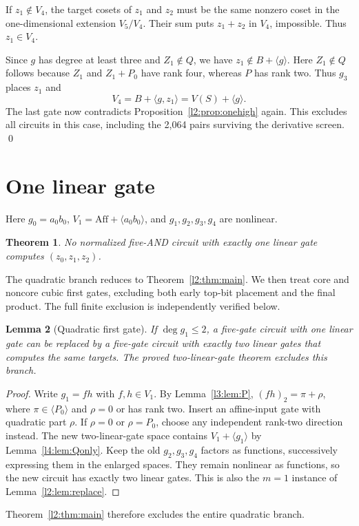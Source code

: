 \documentclass[11pt,a4paper]{article}
\theoremstyle{plain}
\newtheorem{theorem}{Theorem}
\newtheorem{lemma}[theorem]{Lemma}
\theoremstyle{remark}
\newcommand{\Aff}{\mathrm{Aff}}
\begin{document}
If $z_1\notin V_4$, the target cosets of $z_1$ and $z_2$ must be the same nonzero coset in the one-dimensional extension $V_5/V_4$. Their sum puts $z_1+z_2$ in $V_4$, impossible. Thus $z_1\in V_4$.

Since $g$ has degree at least three and $Z_1\notin Q$, we have $z_1\notin B+\langle g\rangle$. Here $Z_1\notin Q$ follows because $Z_1$ and $Z_1+P_0$ have rank four, whereas $P$ has rank two. Thus $g_3$ places $z_1$ and
\[
V_4=B+\langle g,z_1\rangle=V(S)+\langle g\rangle.
\]
The last gate now contradicts Proposition~\ref{l2:prop:onehigh} again. This excludes all circuits in this case, including the 2,064 pairs surviving the derivative screen. \qed

\section{One linear gate}\label{sec:lambda1}
Here $g_0=a_0b_0$, $V_1=\Aff+\langle a_0b_0\rangle$, and $g_1,g_2,g_3,g_4$ are nonlinear.

\begin{theorem}\label{l1:thm:main}
No normalized five-AND circuit with exactly one linear gate computes $(z_0,z_1,z_2)$.
\end{theorem}
The quadratic branch reduces to Theorem~\ref{l2:thm:main}. We then treat core and noncore cubic first gates, excluding both early top-bit placement and the final product. The full finite exclusion is independently verified below.

\begin{lemma}[Quadratic first gate]\label{l1:lem:reduce}
If $\deg g_1\le2$, a five-gate circuit with one linear gate can be replaced by a five-gate circuit with exactly two linear gates that computes the same targets. The proved two-linear-gate theorem excludes this branch.
\end{lemma}
\begin{proof}
Write $g_1=fh$ with $f,h\in V_1$. By Lemma~\ref{l3:lem:P}, $(fh)_2=\pi+\rho$, where $\pi\in\langle P_0\rangle$ and $\rho=0$ or has rank two. Insert an affine-input gate with quadratic part $\rho$. If $\rho=0$ or $\rho=P_0$, choose any independent rank-two direction instead. The new two-linear-gate space contains $V_1+\langle g_1\rangle$ by Lemma~\ref{l4:lem:Qonly}. Keep the old $g_2,g_3,g_4$ factors as functions, successively expressing them in the enlarged spaces. They remain nonlinear as functions, so the new circuit has exactly two linear gates. This is also the $m=1$ instance of Lemma~\ref{l2:lem:replace}.
\end{proof}
Theorem~\ref{l2:thm:main} therefore excludes the entire quadratic branch.
\end{document}
